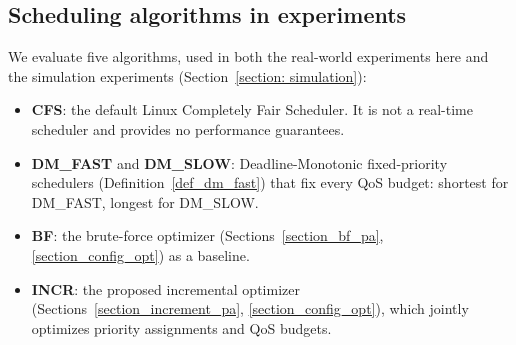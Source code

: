 	\subsection{Scheduling algorithms in experiments}
    \label{section: exp_methods}
    We evaluate five algorithms, used in both the real-world experiments here
    and the simulation experiments (Section~\ref{section: simulation}):
	\begin{itemize}
		\item \textbf{CFS}: the default Linux Completely Fair Scheduler.
        It is not a real-time scheduler and provides no performance guarantees.
		\item \textbf{DM\_FAST} and \textbf{DM\_SLOW}: Deadline-Monotonic
        fixed-priority schedulers (Definition~\ref{def_dm_fast}) that fix every
        QoS budget: shortest for DM\_FAST, longest for DM\_SLOW.
		\item \textbf{BF}: the brute-force optimizer
        (Sections~\ref{section_bf_pa}, \ref{section_config_opt}) as a baseline.
		\item \textbf{INCR}: the proposed incremental optimizer
        (Sections~\ref{section_increment_pa}, \ref{section_config_opt}),
        which jointly optimizes priority assignments and QoS budgets.
	\end{itemize}
	
